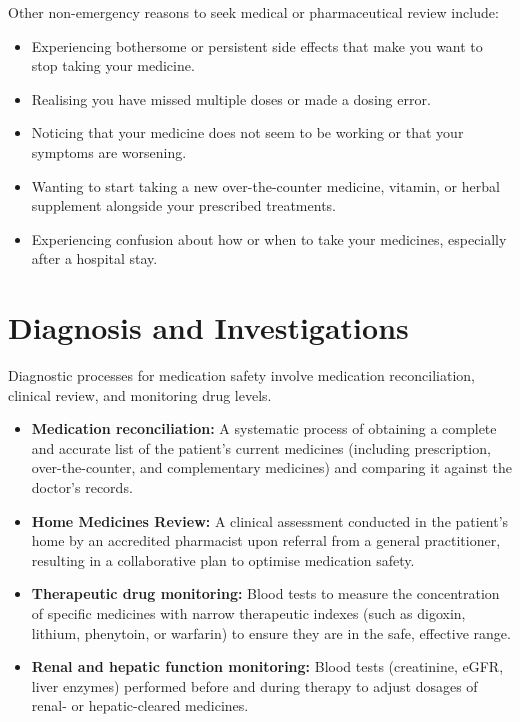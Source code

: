Other non-emergency reasons to seek medical or pharmaceutical review include:
\begin{itemize}
    \item Experiencing bothersome or persistent side effects that make you want to stop taking your medicine.
    \item Realising you have missed multiple doses or made a dosing error.
    \item Noticing that your medicine does not seem to be working or that your symptoms are worsening.
    \item Wanting to start taking a new over-the-counter medicine, vitamin, or herbal supplement alongside your prescribed treatments.
    \item Experiencing confusion about how or when to take your medicines, especially after a hospital stay.
\end{itemize}

\section*{Diagnosis and Investigations}
Diagnostic processes for medication safety involve medication reconciliation, clinical review, and monitoring drug levels.
\begin{itemize}
    \item \textbf{Medication reconciliation:} A systematic process of obtaining a complete and accurate list of the patient's current medicines (including prescription, over-the-counter, and complementary medicines) and comparing it against the doctor's records.
    \item \textbf{Home Medicines Review:} A clinical assessment conducted in the patient's home by an accredited pharmacist upon referral from a general practitioner, resulting in a collaborative plan to optimise medication safety.
    \item \textbf{Therapeutic drug monitoring:} Blood tests to measure the concentration of specific medicines with narrow therapeutic indexes (such as digoxin, lithium, phenytoin, or warfarin) to ensure they are in the safe, effective range.
    \item \textbf{Renal and hepatic function monitoring:} Blood tests (creatinine, eGFR, liver enzymes) performed before and during therapy to adjust dosages of renal- or hepatic-cleared medicines.
\end{itemize}

